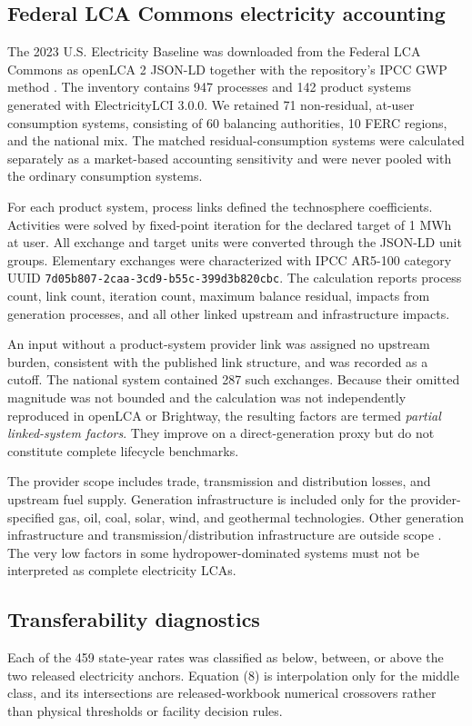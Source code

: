 \documentclass[review,12pt]{elsarticle}
\begin{document}
\subsection{Federal LCA Commons electricity accounting}
The 2023 U.S. Electricity Baseline was downloaded from the Federal LCA Commons as openLCA 2 JSON-LD together with the repository's IPCC GWP method \cite{ref42}. The inventory contains 947 processes and 142 product systems generated with ElectricityLCI 3.0.0. We retained 71 non-residual, at-user consumption systems, consisting of 60 balancing authorities, 10 FERC regions, and the national mix. The matched residual-consumption systems were calculated separately as a market-based accounting sensitivity and were never pooled with the ordinary consumption systems.

For each product system, process links defined the technosphere coefficients. Activities were solved by fixed-point iteration for the declared target of 1 MWh at user. All exchange and target units were converted through the JSON-LD unit groups. Elementary exchanges were characterized with IPCC AR5-100 category UUID \texttt{7d05b807-2caa-3cd9-b55c-399d3b820cbc}. The calculation reports process count, link count, iteration count, maximum balance residual, impacts from generation processes, and all other linked upstream and infrastructure impacts.

An input without a product-system provider link was assigned no upstream burden, consistent with the published link structure, and was recorded as a cutoff. The national system contained 287 such exchanges. Because their omitted magnitude was not bounded and the calculation was not independently reproduced in openLCA or Brightway, the resulting factors are termed \textit{partial linked-system factors}. They improve on a direct-generation proxy but do not constitute complete lifecycle benchmarks.

The provider scope includes trade, transmission and distribution losses, and upstream fuel supply. Generation infrastructure is included only for the provider-specified gas, oil, coal, solar, wind, and geothermal technologies. Other generation infrastructure and transmission/distribution infrastructure are outside scope \cite{ref42}. The very low factors in some hydropower-dominated systems must not be interpreted as complete electricity LCAs.

\subsection{Transferability diagnostics}
Each of the 459 state-year rates was classified as below, between, or above the two released electricity anchors. Equation (8) is interpolation only for the middle class, and its intersections are released-workbook numerical crossovers rather than physical thresholds or facility decision rules.
\end{document}
